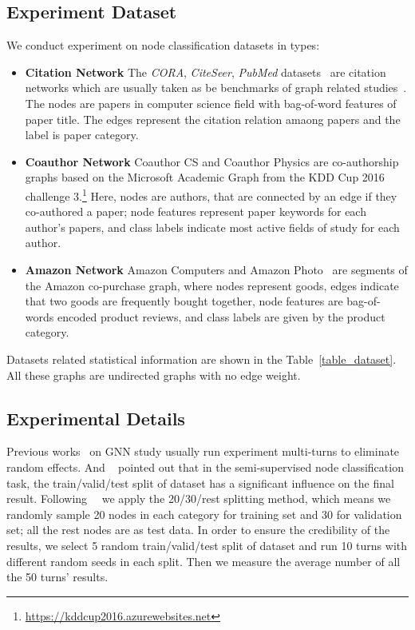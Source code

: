 \documentclass[letterpaper]{article} \usepackage{aaai20}  \usepackage{times}  \usepackage{helvet} \usepackage{courier}  \usepackage[hyphens]{url}  \usepackage{graphicx} \urlstyle{rm} \def\UrlFont{\rm}  \frenchspacing  \setlength{\pdfpagewidth}{8.5in}  \setlength{\pdfpageheight}{11in}  \setcounter{secnumdepth}{0}
\newcommand{\citet}[1]{\citeauthor{#1}~\shortcite{#1}}
\newcommand{\citep}{\cite}
\begin{document}
\subsection{Experiment Dataset}
We conduct experiment on  node classification datasets in  types:
\begin{itemize}
    \item \textbf{Citation Network} The \textit{CORA}, \textit{CiteSeer}, \textit{PubMed} datasets~\citep{dataset_real_ccp} are citation networks which are usually taken as be benchmarks of graph related studies~\citep{analysis_smoothing,analysis_lowpass}. The nodes are papers in computer science field with bag-of-word features of paper title. The edges represent the citation relation amaong papers and the label is paper category.
    \item \textbf{Coauthor Network} Coauthor CS and Coauthor Physics are co-authorship graphs based on the Microsoft Academic Graph from the KDD Cup 2016 challenge 3.\footnote{\url{https://kddcup2016.azurewebsites.net} } Here, nodes are authors, that are connected by an edge if they co-authored a paper; node features represent paper keywords for each author’s papers, and class labels indicate most active fields of study for each author.
    \item \textbf{Amazon Network} Amazon Computers and Amazon Photo~\citep{dataset_real_amazon} are segments of the Amazon co-purchase graph, where nodes represent goods, edges indicate that two goods are frequently bought together, node features are bag-of-words encoded product reviews, and class labels are given by the product category.
\end{itemize}
Datasets related statistical information are shown  in the Table~\ref{table_dataset}. All these graphs are undirected graphs with no edge weight.

\subsection{Experimental Details}
Previous works~\citep{model_gat,model_hyper_graph,graph2seq_liweiacl} on GNN study usually run experiment multi-turns to eliminate random effects. And \citet{dataset_amazon} pointed out that in the semi-supervised node classification task, the train/valid/test split of dataset has a significant influence on the final result. 
Following~\citet{dataset_amazon,method_fishergcn} we apply the 20/30/rest splitting method, which means we randomly sample 20 nodes in each category for training set and 30 for validation set; all the rest nodes are as test data.
In order to ensure the credibility of the results, we select 5 random train/valid/test split of dataset and run 10 turns with different random seeds in each split. Then we measure the average number of all the 50 turns' results.
\end{document}
